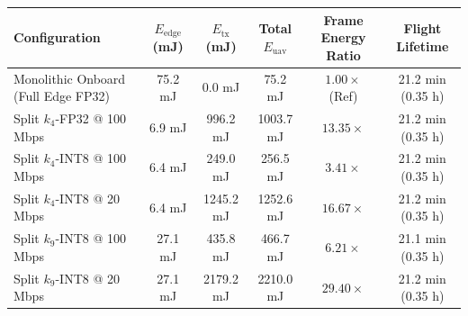 \begin{tabular}{@{}lccccc@{}}
\toprule
\textbf{Configuration} & \textbf{$E_{\text{edge}}$ (mJ)} & \textbf{$E_{\text{tx}}$ (mJ)} & \textbf{Total $E_{\text{uav}}$} & \textbf{Frame Energy Ratio} & \textbf{Flight Lifetime} \\ \midrule
Monolithic Onboard (Full Edge FP32) & 75.2 mJ & 0.0 mJ & 75.2 mJ & $1.00\times$ (Ref) & 21.2 min (0.35 h) \\
Split $k_4$-FP32 @ 100 Mbps & 6.9 mJ & 996.2 mJ & 1003.7 mJ & $13.35\times$ & 21.2 min (0.35 h) \\
Split $k_4$-INT8 @ 100 Mbps & 6.4 mJ & 249.0 mJ & 256.5 mJ & $3.41\times$ & 21.2 min (0.35 h) \\
Split $k_4$-INT8 @ 20 Mbps & 6.4 mJ & 1245.2 mJ & 1252.6 mJ & $16.67\times$ & 21.2 min (0.35 h) \\
Split $k_9$-INT8 @ 100 Mbps & 27.1 mJ & 435.8 mJ & 466.7 mJ & $6.21\times$ & 21.1 min (0.35 h) \\
Split $k_9$-INT8 @ 20 Mbps & 27.1 mJ & 2179.2 mJ & 2210.0 mJ & $29.40\times$ & 21.2 min (0.35 h) \\
\bottomrule
\end{tabular}
